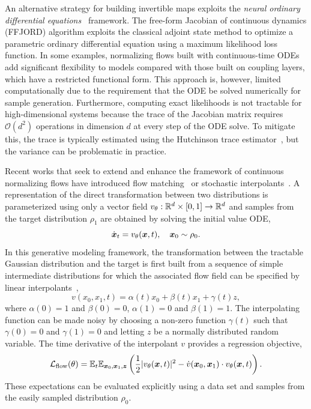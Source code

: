 \documentclass[11pt]{article}
\begin{document}
An alternative strategy for building invertible maps exploits the \emph{neural ordinary differential equations}~\cite{chen_neural_2018} framework.
The free-form Jacobian of continuous dynamics (FFJORD) algorithm exploits the classical adjoint state method to optimize a parametric ordinary differential equation using a maximum likelihood loss function. 
In some examples, normalizing flows built with continuous-time ODEs add significant flexibility to models compared with those built on coupling layers, which have a restricted functional form.
This approach is, however, limited computationally due to the requirement that the ODE be solved numerically for sample generation. 
Furthermore, computing exact likelihoods is not tractable for high-dimensional systems because the trace of the Jacobian matrix requires $\mathcal{O}(d^2)$ operations in dimension $d$ at every step of the ODE solve.
To mitigate this, the trace is typically estimated using the Hutchinson trace estimator~\cite{hutchinson_stochastic_1989}, but the variance can be problematic in practice. 

Recent works that seek to extend and enhance the framework of continuous normalizing flows have introduced flow matching~\cite{liu_flow_2022,lipman_flow_2022} or stochastic interpolants~\cite{albergo_building_2023, albergo_stochastic_2023}.
A representation of the direct transformation between two distributions is parameterized using only a vector field $v_{\theta}: \mathbb{R}^d\times[0,1]\to \mathbb{R}^d$ and samples from the target distribution $\rho_1$ are obtained by solving the initial value ODE,
\begin{equation}
    \dot {\boldsymbol{x}}_t = v_{\theta}(\boldsymbol{x},t), \quad \boldsymbol{x}_0 \sim \rho_0.
\end{equation}
In this generative modeling framework, the transformation between the tractable Gaussian distribution and the target is first built from a sequence of simple intermediate distributions for which the associated flow field can be specified by linear interpolants~\cite{lipman_flow_2022, liu_flow_2022, albergo_building_2023}, 
\begin{equation}
    v(x_0, x_1, t) = \alpha(t) x_0 + \beta(t) x_1 + \gamma(t) z,
\end{equation}
where $\alpha(0)=1$ and $\beta(0)=0$, $\alpha(1)=0$ and $\beta(1)=1$.
The interpolating function can be made noisy by choosing a non-zero function $\gamma(t)$ such that $\gamma(0)=0$ and $\gamma(1)=0$ and letting $z$ be a normally distributed random variable.
The time derivative of the interpolant $v$ provides a regression objective, 
\begin{equation}
    \mathcal{L}_{\rm flow}(\theta) = \mathbb{E}_{t} \mathbb{E}_{\boldsymbol{x}_0, \boldsymbol{x}_1, \boldsymbol{z}} \left( \frac12 |v_\theta(\boldsymbol{x}, t)|^2 - \dot v(\boldsymbol{x}_0, \boldsymbol{x}_1) \cdot v_{\theta}(\boldsymbol{x}, t) \right).
\end{equation}
These expectations can be evaluated explicitly using a data set and samples from the easily sampled distribution $\rho_0$.
\end{document}
